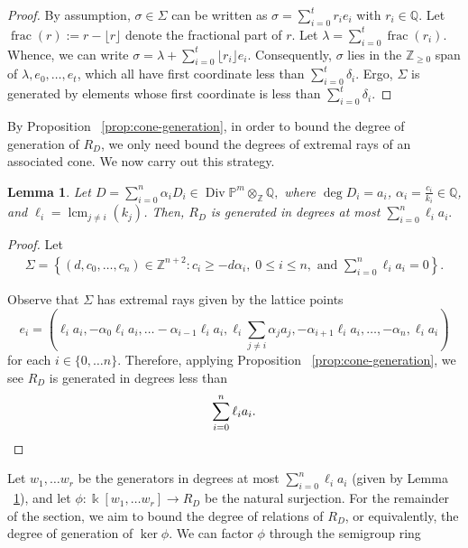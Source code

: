 \documentclass{amsart}
\theoremstyle{plain}
\newtheorem{lem}[thm]{Lemma}
\theoremstyle{definition}
\theoremstyle{remark}
\numberwithin{equation}{section}
\newcommand\bq{{\mathbb Q}}
\newcommand\bp{{\mathbb P}}
\newcommand\bz{{\mathbb Z}}
\newcommand\bk{{\Bbbk}}
\DeclareMathOperator\di{Div}
\newcommand\bida{a}
\newcommand\pdeg{\delta}
\DeclareMathOperator{\fr}{frac}
\DeclareMathOperator{\lcm}{lcm}
\begin{document}
\begin{proof}
By assumption, $\sigma \in \Sigma$ can be written as $\sigma = \sum_
{i = 0}^{t} r_i e_i$ with $r_i \in \bq$. Let $\fr(r) := r - \lfloor r
\rfloor$ denote the fractional part of $r$. Let $\lambda = \sum_{i = 0}
^{t} \fr(r_i)$. Whence, we can write $\sigma = \lambda + \sum_{i = 0}
^{t} \lfloor r_i \rfloor e_i.$ Consequently, $\sigma$ lies in the
$\bz_{\geq 0}$ span of $\lambda, e_0, \ldots, e_t$, which all have
first coordinate less than $\sum_{i=0}^{t} \pdeg_i$. Ergo, $\Sigma$ is
generated by elements whose first coordinate is less than
$\sum_{i = 0}^{t} \pdeg_i$.
\end{proof}

By Proposition ~\ref{prop:cone-generation}, in order to bound
the degree of generation of $R_D$, we only need bound
the degrees of extremal rays of an associated cone. We now carry out
this strategy.

\begin{lem} \label{lem:proj-generators}
Let $D = \sum_{i=0}^{n} \alpha_i D_i \in \di \bp^m \otimes_\bz \bq,$ where
$\deg D_i = \bida_i$, $\alpha_i = \frac{c_i}{k_i}\in \bq$, and
$\ell_i = \lcm_{j \neq i} (k_j)$. Then, $R_D$ is generated in degrees at most $\sum_{i=0}^n \ell_i \bida_i.$
\end{lem}
\begin{proof}
Let 
\begin{align}\label{eqn:Sigma-defn}
	\Sigma = \left \{(d, c_0, \ldots, c_n) \in \bz^{n+2} \colon c_i \geq - d
\alpha_i, \; 0 \leq i \leq n, \text{ and } \sum_{i=0}^{n} \ell_i \bida_i = 0
\right \}.
\end{align}

Observe that $\Sigma$ has extremal rays given by the lattice points 
\begin{equation}\label{eqn:e-i-proj}
	e_i = \left(\ell_i \bida_i, - \alpha_0 \ell_i \bida_i, \ldots
-\alpha_{i-1} \ell_i \bida_i, \ell_i \sum_{j\ne i} \alpha_j \bida_j,
-\alpha_{i+1} \ell_i \bida_i, \ldots, -\alpha_n, \ell_i \bida_i \right)
\end{equation}
for each $i\in \{0, \ldots n\}$.
Therefore, applying Proposition ~\ref{prop:cone-generation}, we see $R_D$ is generated in degrees less than
\[
	\sum_{i=0}^n \ell_i \bida_i.
\qedhere
\]\end{proof}

Let $w_1, \ldots w_r$ be the generators in degrees at most $\sum_{i=0}^n \ell_i
\bida_i$ (given by Lemma ~\ref{lem:proj-generators}), and let 
$\phi \colon \bk[w_1, \ldots w_r] \to R_D$ be the natural surjection.
For the remainder of the section, we aim to bound the degree of relations
of $R_D$, or equivalently, the degree of generation of $\ker \phi$.
We can factor $\phi$ through the
semigroup ring 
\end{document}
